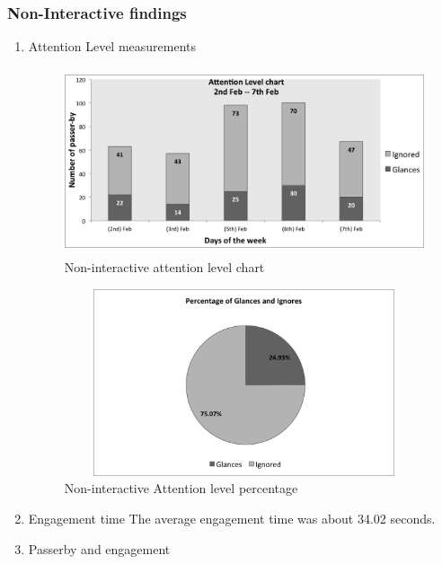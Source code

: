 \subsubsection{Non-Interactive findings}



\begin{enumerate}

\item Attention Level measurements

\begin{figure}[H]
    \centering
    \includegraphics[width=110mm,height=55mm]{Figures/8/non_inter_findings/Non_Inter_chart}%
    \caption{Non-interactive attention level chart}%
    \label{fig:Nonattentionlevelchart}%
\end{figure}



\begin{figure}[H]
    \centering
    \includegraphics[width=110mm,height=55mm]{Figures/8/non_inter_findings/non_inter_percentage}
    \caption{Non-interactive Attention level percentage}%
    \label{fig:Nonattentionlevelpercentage}%
\end{figure}



\item Engagement time
The average engagement time was about 34.02 seconds.

\item Passerby and engagement



\end{enumerate}
